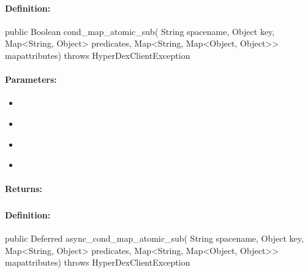\paragraph{Definition:}
\begin{javacode}
public Boolean cond_map_atomic_sub(
        String spacename,
        Object key,
        Map<String, Object> predicates,
        Map<String, Map<Object, Object>> mapattributes) throws HyperDexClientException
\end{javacode}

\paragraph{Parameters:}
\begin{itemize}[noitemsep]
\item {}\\

\item {}\\

\item {}\\

\item {}\\

\end{itemize}

\paragraph{Returns:}


\pagebreak
\subsubsection{}
\label{api:java:async_cond_map_atomic_sub}


\paragraph{Definition:}
\begin{javacode}
public Deferred async_cond_map_atomic_sub(
        String spacename,
        Object key,
        Map<String, Object> predicates,
        Map<String, Map<Object, Object>> mapattributes) throws HyperDexClientException
\end{javacode}

